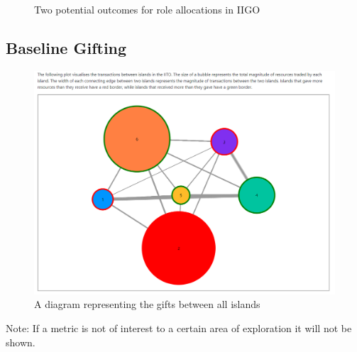 \begin{figure}
    \centering
    \caption{Two potential outcomes for role allocations in IIGO}
    \label{fig:Simulations:iigo_roles}
\end{figure}

\subsection{Baseline Gifting}
\label{subsec:Simulations:baseline:trading}

\begin{figure}[H] 
    \centering
    \includegraphics[width=1\textwidth]{15_simulations/images/baseline_gifts.png}
    \caption{A diagram representing the gifts between all islands}
    \label{fig:Simulations:IITO_gifts}
\end{figure} 

Note: If a metric is not of interest to a certain area of exploration it will not be shown.